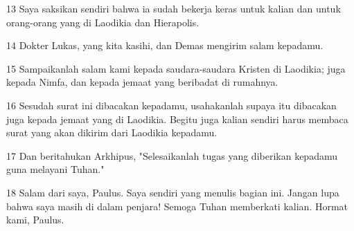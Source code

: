 \par 13 Saya saksikan sendiri bahwa ia sudah bekerja keras untuk kalian dan untuk orang-orang yang di Laodikia dan Hierapolis.
\par 14 Dokter Lukas, yang kita kasihi, dan Demas mengirim salam kepadamu.
\par 15 Sampaikanlah salam kami kepada saudara-saudara Kristen di Laodikia; juga kepada Nimfa, dan kepada jemaat yang beribadat di rumahnya.
\par 16 Sesudah surat ini dibacakan kepadamu, usahakanlah supaya itu dibacakan juga kepada jemaat yang di Laodikia. Begitu juga kalian sendiri harus membaca surat yang akan dikirim dari Laodikia kepadamu.
\par 17 Dan beritahukan Arkhipus, "Selesaikanlah tugas yang diberikan kepadamu guna melayani Tuhan."
\par 18 Salam dari saya, Paulus. Saya sendiri yang menulis bagian ini. Jangan lupa bahwa saya masih di dalam penjara! Semoga Tuhan memberkati kalian. Hormat kami, Paulus.


